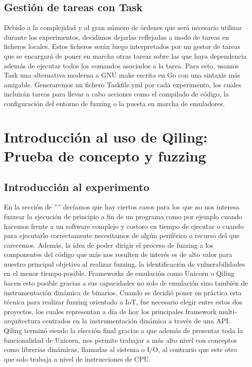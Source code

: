 \subsection{Gestión de tareas con Task}
Debido a la complejidad y al gran número de órdenes que será necesario utilizar durante los experimentos, decidimos dejarlas reflejadas a modo de tareas
en ficheros locales. Estos ficheros serán luego interpretados por un gestor de tareas que se encargará de poner en marcha otras tareas sobre las que haya 
dependencia además de ejecutar todos los comandos asociados a la tarea. Para esto, usamos Task\cite{task} una alternativa moderna a GNU make escrita en Go con una sintaxis más 
amigable. Generaremos un fichero Taskfile.yml por cada experimento, los cuales incluirán tareas para llevar a cabo acciones como el compilado de código,
la configuración del entorno de fuzzing o la puesta en marcha de emuladores.

\section{Introducción al uso de Qiling: Prueba de concepto y fuzzing}
\subsection{Introducción al experimento}
En la sección de '''' decíamos que hay ciertos casos para los que no nos interesa fuzzear la ejecución de principio a fin 
de un programa como por ejemplo cuando hacemos frente a un software complejo y costoso en tiempo de ejecutar o cuando para ejecutarlo correctamente necesitamos de algún periférico o recurso del que carecemos. Además, la idea de poder dirigir el proceso de fuzzing a los componentes del código que más nos 
resulten de interés es de alto valor para nuestro principal objetivo al realizar fuzzing, la identificación de vulnerabilidades en el menor tiempo posible.
Frameworks de emulación como Unicorn o Qiling hacen esto posible gracias a sus capacidades no solo de emulación sino también de instrumentación dinámica de binarios.
Cuando se decidió poner en práctica esta técnica para realizar fuzzing orientado a IoT, fue necesario elegir entre estos dos proyectos, los cuales 
representan a día de hoy los principales framework multi-arquitectura centrados en la instrumentación dinámica a través de una API. Qiling terminó siendo 
la elección final gracias a que además de presentar toda la funcionalidad de Unicorn, nos permite trabajar a más alto nivel con conceptos como librerías dinámicas,
llamadas al sistema o I/O, al contrario que este otro que solo trabaja a nivel de instrucciones de CPU.\bigskip

